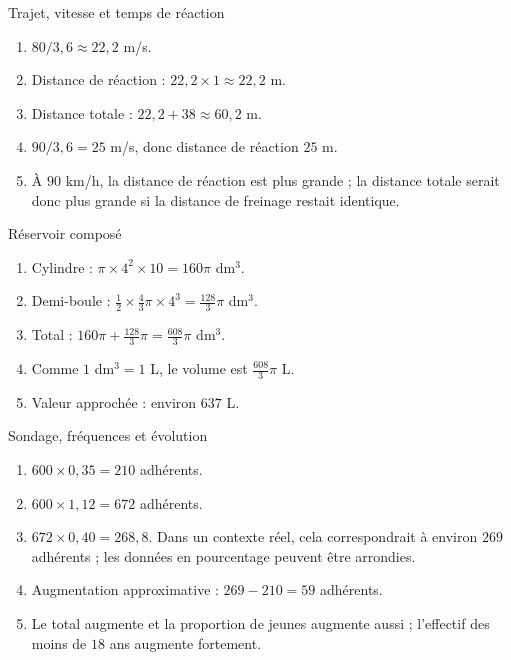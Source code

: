\documentclass[11pt,a4paper]{article}
\newcounter{corr}
\begin{document}
\begin{corrbox}{Trajet, vitesse et temps de réaction}
\begin{enumerate}
\item $80/3{,}6\approx22{,}2$ m/s.
\item Distance de réaction : $22{,}2\times1\approx22{,}2$ m.
\item Distance totale : $22{,}2+38\approx60{,}2$ m.
\item $90/3{,}6=25$ m/s, donc distance de réaction $25$ m.
\item À $90$ km/h, la distance de réaction est plus grande ; la distance totale serait donc plus grande si la distance de freinage restait identique.
\end{enumerate}
\end{corrbox}

\begin{corrbox}{Réservoir composé}
\begin{enumerate}
\item Cylindre : $\pi\times4^2\times10=160\pi$ dm$^3$.
\item Demi-boule : $\frac12\times\frac43\pi\times4^3=\frac{128}{3}\pi$ dm$^3$.
\item Total : $160\pi+\frac{128}{3}\pi=\frac{608}{3}\pi$ dm$^3$.
\item Comme $1$ dm$^3=1$ L, le volume est $\frac{608}{3}\pi$ L.
\item Valeur approchée : environ $637$ L.
\end{enumerate}
\end{corrbox}

\begin{corrbox}{Sondage, fréquences et évolution}
\begin{enumerate}
\item $600\times0{,}35=210$ adhérents.
\item $600\times1{,}12=672$ adhérents.
\item $672\times0{,}40=268{,}8$. Dans un contexte réel, cela correspondrait à environ $269$ adhérents ; les données en pourcentage peuvent être arrondies.
\item Augmentation approximative : $269-210=59$ adhérents.
\item Le total augmente et la proportion de jeunes augmente aussi ; l'effectif des moins de $18$ ans augmente fortement.
\end{enumerate}
\end{corrbox}
\end{document}
